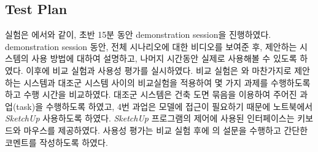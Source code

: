 \subsection{Test Plan}
실험은 \cite{song_penlight:_2009}에서와 같이, 초반 15분 동안 demonstration session을 진행하였다. demonstration session 동안, 전체 시나리오에 대한 비디오를 보여준 후, 제안하는 시스템의 사용 방법에 대하여 설명하고, 나머지 시간동안 실제로 사용해볼 수 있도록 하였다. 이후에 비교 실험과  사용성 평가를 실시하였다. 비교 실험은 \cite{yeh_-site_2012}와 마찬가지로 제안하는 시스템과 대조군 시스템 사이의 비교실험을 적용하여 몇 가지 과제를 수행하도록 하고 수행 시간을 비교하였다. 대조군 시스템은 건축 도면 묶음을 이용하여 주어진 과업(task)을 수행하도록 하였고, 4번 과업은 모델에 접근이 필요하기 때문에 노트북에서 \textit{SketchUp} 사용하도록 하였다. \textit{SketchUp} 프로그램의 제어에 사용된 인터페이스는 키보드와 마우스를 제공하였다. 사용성 평가는 비교 실험 후에 \cite{davis_perceived_1989}의 설문을 수행하고 간단한 코멘트를 작성하도록 하였다.


